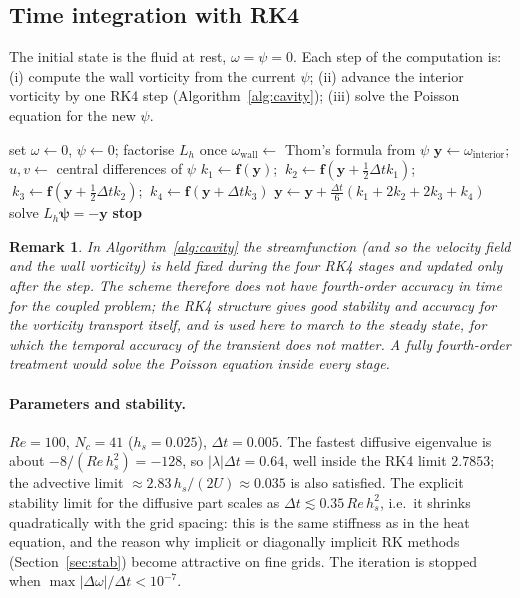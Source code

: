 \documentclass[11pt,a4paper]{article}
\newcommand{\Dt}{\Delta t}
\newcommand{\bfy}{\mathbf{y}}
\newcommand{\bff}{\mathbf{f}}
\newtheorem{remark}{Remark}
\begin{document}
\subsection{Time integration with RK4}

The initial state is the fluid at rest, $\omega=\psi=0$. Each step of the computation is: (i) compute
the wall vorticity from the current $\psi$; (ii) advance the interior vorticity by one RK4 step
(Algorithm~\ref{alg:cavity}); (iii) solve the Poisson equation for the new $\psi$.

\begin{algorithm}[H]
\caption{Lid-driven cavity: method of lines with RK4}\label{alg:cavity}
\begin{algorithmic}[1]
\State set $\omega\gets0$, $\psi\gets0$; factorise $L_h$ once
  \State $\omega_{\mathrm{wall}}\gets$ Thom's formula from $\psi$ 
  \State $\bfy\gets\omega_{\mathrm{interior}}$; $u,v\gets$ central differences of $\psi$
  \State $k_1\gets\bff(\bfy)$; $\ k_2\gets\bff(\bfy+\tfrac12\Dt k_1)$; $\ k_3\gets\bff(\bfy+\tfrac12\Dt k_2)$; $\ k_4\gets\bff(\bfy+\Dt k_3)$
  \State $\bfy\gets\bfy+\tfrac{\Dt}{6}(k_1+2k_2+2k_3+k_4)$
  \State solve $L_h\boldsymbol\psi=-\bfy$ 
  \If{$\max|\bfy_{\mathrm{new}}-\bfy_{\mathrm{old}}|/\Dt<10^{-7}$} \State \textbf{stop} \EndIf
\EndFor
\end{algorithmic}
\end{algorithm}

\begin{remark}
In Algorithm~\ref{alg:cavity} the streamfunction (and so the velocity field and the wall vorticity)
is held fixed during the four RK4 stages and updated only after the step. The scheme therefore does
\emph{not} have fourth-order accuracy in time for the coupled problem; the RK4 structure gives good
stability and accuracy for the vorticity transport itself, and is used here to march to the steady
state, for which the temporal accuracy of the transient does not matter. A fully fourth-order treatment
would solve the Poisson equation inside every stage.
\end{remark}

\paragraph{Parameters and stability.} $Re=100$, $N_c=41$ ($h_s=0.025$), $\Dt=0.005$. The fastest
diffusive eigenvalue is about $-8/(Re\,h_s^2)=-128$, so $|\lambda|\Dt=0.64$, well inside the RK4 limit
$2.7853$; the advective limit $\approx2.83\,h_s/(2U)\approx0.035$ is also satisfied. The explicit
stability limit for the diffusive part scales as $\Dt\lesssim0.35\,Re\,h_s^2$, i.e.\ it shrinks
quadratically with the grid spacing: this is the same stiffness as in the heat equation, and the reason
why implicit or diagonally implicit RK methods (Section~\ref{sec:stab}) become attractive on fine grids.
The iteration is stopped when $\max|\Delta\omega|/\Dt<10^{-7}$.
\end{document}
